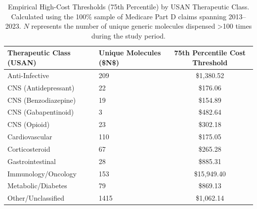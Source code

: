 \begin{table}[htbp]
\caption{Empirical High-Cost Thresholds (75th Percentile) by USAN Therapeutic Class. Calculated using the 100\% sample of Medicare Part D claims spanning 2013--2023. $N$ represents the number of unique generic molecules dispensed >100 times during the study period.}
\label{tab:empirical_costs}
\begin{tabular}{llc}
\toprule
\rowcolor{gray!10}
Therapeutic Class (USAN) & Unique Molecules (\$N\$) & 75th Percentile Cost Threshold \\
\midrule
Anti-Infective & 209 & \$1,380.52 \\
CNS (Antidepressant) & 22 & \$176.06 \\
CNS (Benzodiazepine) & 19 & \$154.89 \\
CNS (Gabapentinoid) & 3 & \$482.64 \\
CNS (Opioid) & 23 & \$302.18 \\
Cardiovascular & 110 & \$175.05 \\
Corticosteroid & 67 & \$265.28 \\
Gastrointestinal & 28 & \$885.31 \\
Immunology/Oncology & 153 & \$15,949.40 \\
Metabolic/Diabetes & 79 & \$869.13 \\
Other/Unclassified & 1415 & \$1,062.14 \\
\bottomrule
\end{tabular}
\end{table}

